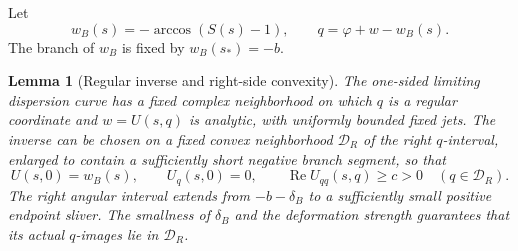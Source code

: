 \documentclass[11pt]{article}
\numberwithin{equation}{section}
\newtheorem{lemma}[theorem]{Lemma}
\theoremstyle{remark}\newtheorem{remark}[theorem]{Remark}
\newcommand{\Rea}{\operatorname{Re}}
\begin{document}
Let
\[
 w_B(s)=-\arccos(S(s)-1),\qquad
 q=\varphi+w-w_B(s).
\]
The branch of $w_B$ is fixed by $w_B(s_*)=-b$.

\begin{lemma}[Regular inverse and right-side convexity]\label{lem:inverse}
The one-sided limiting dispersion curve has a fixed complex
neighborhood on which $q$ is a regular coordinate and $w=U(s,q)$ is
analytic, with uniformly bounded fixed jets. The inverse can be chosen
on a fixed convex neighborhood $\mathcal D_R$ of the right $q$-interval,
enlarged to contain a sufficiently short negative branch segment, so
that
\[
 U(s,0)=w_B(s),\qquad U_q(s,0)=0,\qquad
 \Rea U_{qq}(s,q)\ge c>0 \quad(q\in\mathcal D_R).
\]
The right angular interval extends from $-b-\delta_B$ to a sufficiently
small positive endpoint sliver. The smallness of $\delta_B$ and the
deformation strength guarantees that its actual $q$-images lie in
$\mathcal D_R$.
\end{lemma}
\end{document}
